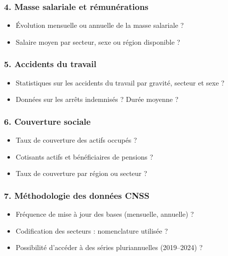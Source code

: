 \documentclass{beamer}
\begin{document}
\begin{frame}
\frametitle{4. Masse salariale et rémunérations}
\begin{itemize}
  \item Évolution mensuelle ou annuelle de la masse salariale ?
  \item Salaire moyen par secteur, sexe ou région disponible ?
\end{itemize}
\end{frame}

\begin{frame}
\frametitle{5. Accidents du travail}
\begin{itemize}
  \item Statistiques sur les accidents du travail par gravité, secteur et sexe ?
  \item Données sur les arrêts indemnisés ? Durée moyenne ?
\end{itemize}
\end{frame}

\begin{frame}
\frametitle{6. Couverture sociale}
\begin{itemize}
  \item Taux de couverture des actifs occupés ?
  \item Cotisants actifs et bénéficiaires de pensions ?
  \item Taux de couverture par région ou secteur ?
\end{itemize}
\end{frame}

\begin{frame}
\frametitle{7. Méthodologie des données CNSS}
\begin{itemize}
  \item Fréquence de mise à jour des bases (mensuelle, annuelle) ?
  \item Codification des secteurs : nomenclature utilisée ?
  \item Possibilité d’accéder à des séries pluriannuelles (2019–2024) ?
\end{itemize}
\end{frame}
\end{document}
